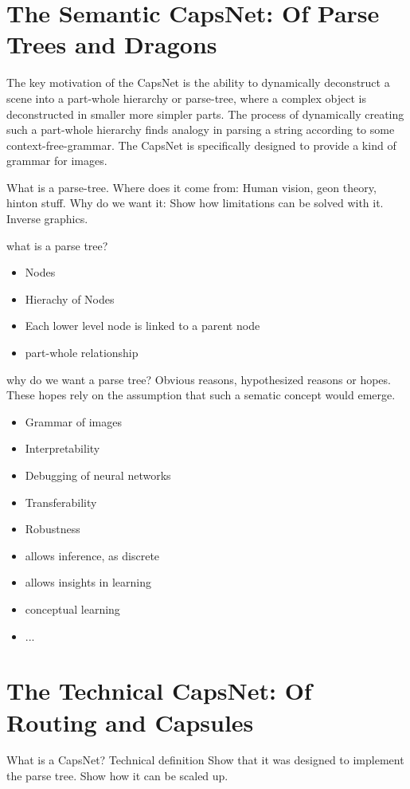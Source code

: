 \documentclass{article}
\begin{document}
\section{The Semantic CapsNet: Of Parse Trees and Dragons}

The key motivation of the CapsNet is the ability to dynamically deconstruct a scene into a part-whole hierarchy or parse-tree, where a complex object is deconstructed in smaller more simpler parts.
The process of dynamically creating such a part-whole hierarchy finds analogy in parsing a string according to some context-free-grammar.
The CapsNet is specifically designed to provide a kind of grammar for images.

What is a parse-tree.
Where does it come from: Human vision, geon theory, hinton stuff.
Why do we want it: Show how limitations can be solved with it. Inverse graphics.

what is a parse tree?
\begin{itemize}
	\item Nodes
	\item Hierachy of Nodes
	\item Each lower level node is linked to a parent node
	\item part-whole relationship
\end{itemize}
why do we want a parse tree? Obvious reasons, hypothesized reasons or hopes. These hopes rely on the assumption that such a sematic concept would emerge.
\begin{itemize}
	\item Grammar of images
	\item Interpretability
	\item Debugging of neural networks
	\item Transferability
	\item Robustness
	\item allows inference, as discrete
	\item allows insights in learning
	\item conceptual learning
	\item ...
\end{itemize}

\section{The Technical CapsNet: Of Routing and Capsules}

What is a CapsNet? Technical definition
Show that it was designed to implement the parse tree.
Show how it can be scaled up.
\end{document}
